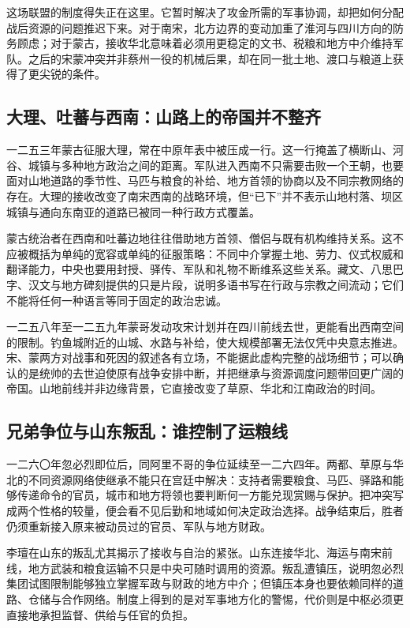 这场联盟的制度得失正在这里。它暂时解决了攻金所需的军事协调，却把如何分配战后资源的问题推迟下来。对于南宋，北方边界的变动加重了淮河与四川方向的防务顾虑；对于蒙古，接收华北意味着必须用更稳定的文书、税粮和地方中介维持军队。之后的宋蒙冲突并非蔡州一役的机械后果，却在同一批土地、渡口与粮道上获得了更尖锐的条件。

\subsection{大理、吐蕃与西南：山路上的帝国并不整齐}

一二五三年蒙古征服大理，常在中原年表中被压成一行。这一行掩盖了横断山、河谷、城镇与多种地方政治之间的距离。军队进入西南不只需要击败一个王朝，也要面对山地道路的季节性、马匹与粮食的补给、地方首领的协商以及不同宗教网络的存在。大理的接收改变了南宋西南的战略环境，但“已下”并不表示山地村落、坝区城镇与通向东南亚的道路已被同一种行政方式覆盖。

蒙古统治者在西南和吐蕃边地往往借助地方首领、僧侣与既有机构维持关系。这不应被概括为单纯的宽容或单纯的征服策略：不同中介掌握土地、劳力、仪式权威和翻译能力，中央也要用封授、驿传、军队和礼物不断维系这些关系。藏文、八思巴字、汉文与地方碑刻提供的只是片段，说明多语书写在行政与宗教之间流动；它们不能将任何一种语言等同于固定的政治忠诚。

一二五八年至一二五九年蒙哥发动攻宋计划并在四川前线去世，更能看出西南空间的限制。钓鱼城附近的山城、水路与补给，使大规模部署无法仅凭中央意志推进。宋、蒙两方对战事和死因的叙述各有立场，不能据此虚构完整的战场细节；可以确认的是统帅的去世迫使原有战争安排中断，并把继承与资源调度问题带回更广阔的帝国。山地前线并非边缘背景，它直接改变了草原、华北和江南政治的时间。

\subsection{兄弟争位与山东叛乱：谁控制了运粮线}

一二六〇年忽必烈即位后，同阿里不哥的争位延续至一二六四年。两都、草原与华北的不同资源网络使继承不能只在宫廷中解决：支持者需要粮食、马匹、驿路和能够传递命令的官员，城市和地方将领也要判断何一方能兑现赏赐与保护。把冲突写成两个性格的较量，便会看不见后勤和地域如何决定政治选择。战争结束后，胜者仍须重新接入原来被动员过的官员、军队与地方财政。

李璮在山东的叛乱尤其揭示了接收与自治的紧张。山东连接华北、海运与南宋前线，地方武装和粮食运输不只是中央可随时调用的资源。叛乱遭镇压，说明忽必烈集团试图限制能够独立掌握军政与财政的地方中介；但镇压本身也要依赖同样的道路、仓储与合作网络。制度上得到的是对军事地方化的警惕，代价则是中枢必须更直接地承担监督、供给与任官的负担。

